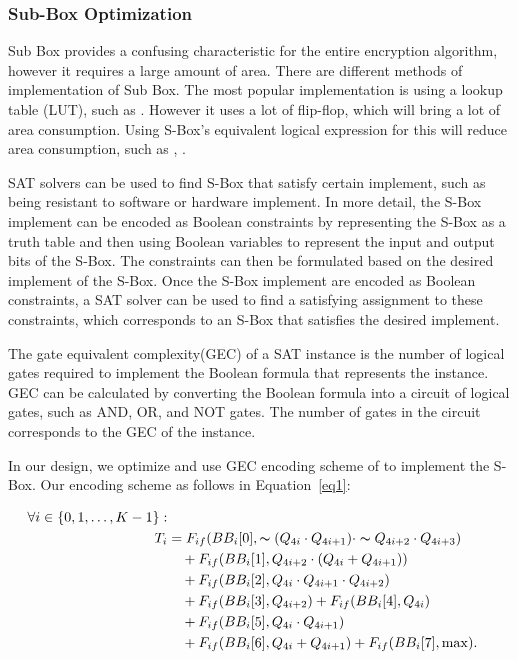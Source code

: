 \documentclass[sn-basic]{sn-jnl}%
\begin{document}
\subsubsection{Sub-Box Optimization }\label{subsubsec1}
Sub Box provides a confusing characteristic for the entire encryption algorithm, however it requires a large amount of area.
There are different methods of implementation of Sub Box.
The most popular implementation is using a lookup table (LUT), such as \cite{lara2017lightweight}.
However it uses a lot of flip-flop, which will bring a lot of area consumption.
Using S-Box's equivalent logical expression for this will reduce area consumption, such as \cite{bao2019peigen}, \cite{bib16}.

SAT solvers can be used to find S-Box that satisfy certain implement, such as being resistant to software or hardware implement.
In more detail, the S-Box implement can be encoded as Boolean constraints by representing the S-Box as a truth table and then using Boolean variables to represent the input and output bits of the S-Box.
The constraints can then be formulated based on the desired implement of the S-Box.
Once the S-Box implement are encoded as Boolean constraints, a SAT solver can be used to find a satisfying assignment to these constraints, which corresponds to an S-Box that satisfies the desired implement.

The gate equivalent complexity(GEC) of a SAT instance is the number of logical gates required to implement the Boolean formula that represents the instance.
GEC can be calculated by converting the Boolean formula into a circuit of logical gates, such as AND, OR, and NOT gates.
The number of gates in the circuit corresponds to the GEC of the instance.

In our design, we optimize and use GEC encoding scheme of \cite{bib16} to implement the S-Box.
Our encoding scheme as follows in Equation~\ref{eq1}:

\begin{align}
    \forall i \in \{0,1,\ldots ,K-1\}: \nonumber                                                                  \\
    T_i & = F_{if} (BB_i[0], \thicksim (Q_{4i} \cdot Q_{4i+1}) \cdot \thicksim Q_{4i+2} \cdot Q_{4i+3}) \nonumber \\
        & \quad + F_{if} (BB_i[1], Q_{4i+2} \cdot (Q_{4i} + Q_{4i+1})) \nonumber                                  \\
        & \quad + F_{if} (BB_i[2], Q_{4i} \cdot Q_{4i+1} \cdot Q_{4i+2}) \nonumber                                \\
        & \quad + F_{if} (BB_i[3], Q_{4i+2}) + F_{if} (BB_i[4], Q_{4i}) \nonumber                                 \\
        & \quad + F_{if} (BB_i[5], Q_{4i} \cdot Q_{4i+1}) \nonumber                                               \\
        & \quad + F_{if} (BB_i[6], Q_{4i} + Q_{4i+1}) + F_{if} (BB_i[7], \max). \label{eq1}
\end{align}
\end{document}
